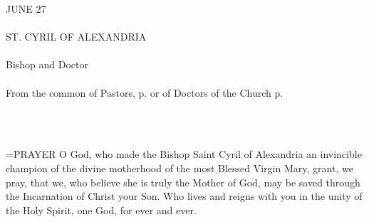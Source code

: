 \begin{center}\normalsize \begin{center}\normalsize JUNE 27\\\\
\footnotesize \footnotesize ST. CYRIL OF ALEXANDRIA\\\\
\footnotesize \footnotesize Bishop and Doctor\\\\
\footnotesize \footnotesize From the common of Pastors, p.    or of Doctors of the Church p. \\\\
\footnotesize \end{center}\\
\end{center}

\hangindent=\parindent \small{PRAYER 
O God, who made the Bishop Saint Cyril of Alexandria
an invincible champion of the divine motherhood
of the most Blessed Virgin Mary,
grant, we pray,
that we, who believe she is truly the Mother of God,
may be saved through the Incarnation of Christ your Son.
Who lives and reigns with you in the unity of the Holy Spirit,
one God, for ever and ever.\\}
 
